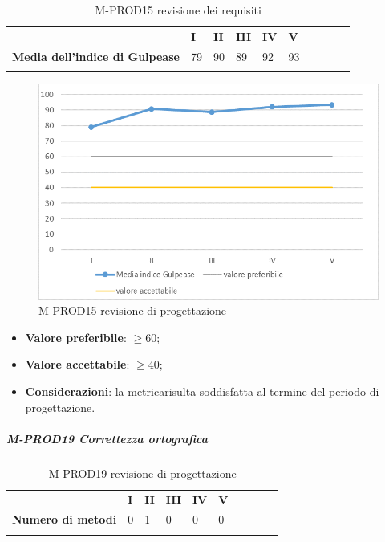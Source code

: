 \begin{longtable} {						
		>{}p{70mm}  		
		>{}p{8mm}		
		>{}p{8mm}		
		>{}p{8mm}		
		>{}p{8mm}		
		>{}p{8mm}		
		>{}p{8mm}
		>{}p{8mm}
		>{}p{8mm}
		>{}p{8mm}				
	}			
	\rowcolor{gray!50}
	\textbf{} & \textbf{I} & \textbf{II} & \textbf{III} & \textbf{IV} & \textbf{V} \TBstrut \\ [2mm]
	\textbf{Media dell'indice di Gulpease} & 79 & 90 & 89 & 92 & 93 \TBstrut \\ [2mm]
	\rowcolor{white}
	\caption{M-PROD15 revisione dei requisiti}
\end{longtable}
\begin{figure}[H] 	
	\includegraphics[width=\linewidth]{./img/grafici/RP20.png}	
	\caption{M-PROD15 revisione di progettazione}	
\end{figure}
\begin{itemize}
	\item \textbf{Valore preferibile}: $\ge60$;
	\item \textbf{Valore accettabile}: $\ge40$;
	\item \textbf{Considerazioni}: la metrica\glosp risulta soddisfatta al termine del periodo di progettazione\glo.
\end{itemize}
\subparagraph{M-PROD19 Correttezza ortografica} \mbox{}
\begin{longtable}[H!] {						
		>{}p{50mm}  		
		>{}p{8mm}
		>{}p{8mm}		
		>{}p{8mm}		
		>{}p{8mm}		
		>{}p{8mm}		
		>{}p{8mm}
		>{}p{8mm}
		>{}p{8mm}
		>{}p{8mm}
	}
	\rowcolor{gray!50}
	\textbf{} & \textbf{I} & \textbf{II} & \textbf{III} & \textbf{IV} & \textbf{V} \TBstrut \\ [2mm]
	\textbf{Numero di metodi} & 0 & 1 & 0 & 0 & 0 \TBstrut \\ [2mm]
	\rowcolor{white}
	\caption{M-PROD19 revisione di progettazione\glo}
\end{longtable}
